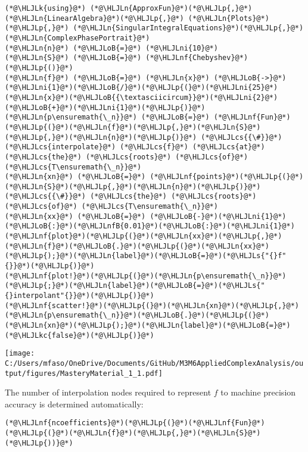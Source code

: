 \documentclass[12pt,a4paper]{article}
\newcommand{\HLJLk}[1]{\textcolor[RGB]{148,91,176}{\textbf{#1}}}
\newcommand{\HLJLkc}[1]{\textcolor[RGB]{59,151,46}{\textit{#1}}}
\newcommand{\HLJLn}[1]{#1}
\newcommand{\HLJLnf}[1]{\textcolor[RGB]{66,102,213}{#1}}
\newcommand{\HLJLs}[1]{\textcolor[RGB]{201,61,57}{#1}}
\newcommand{\HLJLnfB}[1]{\textcolor[RGB]{59,151,46}{#1}}
\newcommand{\HLJLni}[1]{\textcolor[RGB]{59,151,46}{#1}}
\newcommand{\HLJLoB}[1]{\textcolor[RGB]{102,102,102}{\textbf{#1}}}
\newcommand{\HLJLp}[1]{#1}
\newcommand{\HLJLcs}[1]{\textcolor[RGB]{153,153,119}{\textit{#1}}}
\begin{document}
\begin{lstlisting}
(*@\HLJLk{using}@*) (*@\HLJLn{ApproxFun}@*)(*@\HLJLp{,}@*) (*@\HLJLn{LinearAlgebra}@*)(*@\HLJLp{,}@*) (*@\HLJLn{Plots}@*)(*@\HLJLp{,}@*) (*@\HLJLn{SingularIntegralEquations}@*)(*@\HLJLp{,}@*) (*@\HLJLn{ComplexPhasePortrait}@*)
(*@\HLJLn{n}@*) (*@\HLJLoB{=}@*) (*@\HLJLni{10}@*)
(*@\HLJLn{S}@*) (*@\HLJLoB{=}@*) (*@\HLJLnf{Chebyshev}@*)(*@\HLJLp{()}@*)
(*@\HLJLn{f}@*) (*@\HLJLoB{=}@*) (*@\HLJLn{x}@*) (*@\HLJLoB{->}@*) (*@\HLJLni{1}@*)(*@\HLJLoB{/}@*)(*@\HLJLp{(}@*)(*@\HLJLni{25}@*)(*@\HLJLn{x}@*)(*@\HLJLoB{{\textasciicircum}}@*)(*@\HLJLni{2}@*) (*@\HLJLoB{+}@*)(*@\HLJLni{1}@*)(*@\HLJLp{)}@*)
(*@\HLJLn{p\ensuremath{\_n}}@*) (*@\HLJLoB{=}@*) (*@\HLJLnf{Fun}@*)(*@\HLJLp{(}@*)(*@\HLJLn{f}@*)(*@\HLJLp{,}@*)(*@\HLJLn{S}@*)(*@\HLJLp{,}@*)(*@\HLJLn{n}@*)(*@\HLJLp{)}@*) (*@\HLJLcs{{\#}}@*) (*@\HLJLcs{interpolate}@*) (*@\HLJLcs{f}@*) (*@\HLJLcs{at}@*) (*@\HLJLcs{the}@*) (*@\HLJLcs{roots}@*) (*@\HLJLcs{of}@*) (*@\HLJLcs{T\ensuremath{\_n}}@*)
(*@\HLJLn{xn}@*) (*@\HLJLoB{=}@*) (*@\HLJLnf{points}@*)(*@\HLJLp{(}@*)(*@\HLJLn{S}@*)(*@\HLJLp{,}@*)(*@\HLJLn{n}@*)(*@\HLJLp{)}@*) (*@\HLJLcs{{\#}}@*) (*@\HLJLcs{the}@*) (*@\HLJLcs{roots}@*) (*@\HLJLcs{of}@*) (*@\HLJLcs{T\ensuremath{\_n}}@*)
(*@\HLJLn{xx}@*) (*@\HLJLoB{=}@*) (*@\HLJLoB{-}@*)(*@\HLJLni{1}@*)(*@\HLJLoB{:}@*)(*@\HLJLnfB{0.01}@*)(*@\HLJLoB{:}@*)(*@\HLJLni{1}@*)
(*@\HLJLnf{plot}@*)(*@\HLJLp{(}@*)(*@\HLJLn{xx}@*)(*@\HLJLp{,}@*)(*@\HLJLn{f}@*)(*@\HLJLoB{.}@*)(*@\HLJLp{(}@*)(*@\HLJLn{xx}@*)(*@\HLJLp{);}@*)(*@\HLJLn{label}@*)(*@\HLJLoB{=}@*)(*@\HLJLs{"{}f"{}}@*)(*@\HLJLp{)}@*)
(*@\HLJLnf{plot!}@*)(*@\HLJLp{(}@*)(*@\HLJLn{p\ensuremath{\_n}}@*)(*@\HLJLp{;}@*)(*@\HLJLn{label}@*)(*@\HLJLoB{=}@*)(*@\HLJLs{"{}interpolant"{}}@*)(*@\HLJLp{)}@*)
(*@\HLJLnf{scatter!}@*)(*@\HLJLp{(}@*)(*@\HLJLn{xn}@*)(*@\HLJLp{,}@*)(*@\HLJLn{p\ensuremath{\_n}}@*)(*@\HLJLoB{.}@*)(*@\HLJLp{(}@*)(*@\HLJLn{xn}@*)(*@\HLJLp{);}@*)(*@\HLJLn{label}@*)(*@\HLJLoB{=}@*)(*@\HLJLkc{false}@*)(*@\HLJLp{)}@*)
\end{lstlisting}

\texttt{[image: C:/Users/mfaso/OneDrive/Documents/GitHub/M3M6AppliedComplexAnalysis/output/figures/MasteryMaterial\_1\_1.pdf]}

The number of interpolation nodes required to represent $f$ to machine precision accuracy is determined automatically:


\begin{lstlisting}
(*@\HLJLnf{ncoefficients}@*)(*@\HLJLp{(}@*)(*@\HLJLnf{Fun}@*)(*@\HLJLp{(}@*)(*@\HLJLn{f}@*)(*@\HLJLp{,}@*)(*@\HLJLn{S}@*)(*@\HLJLp{))}@*)
\end{lstlisting}
\end{document}
